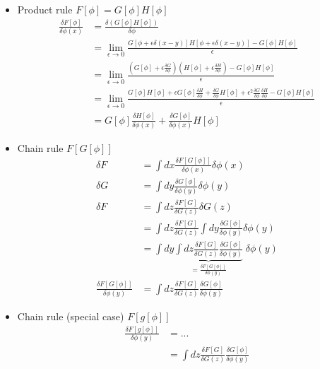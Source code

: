 \documentclass[10pt,a4paper]{article}
\theoremstyle{definition}
\begin{document}
\begin{itemize}
    \item Product rule $F[\phi]=G[\phi]H[\phi]$
    \begin{align}
        \frac{\delta F[\phi]}{\delta\phi(x)}
        &=\frac{\delta(G[\phi]H[\phi])}{\delta\phi}\\
        &=\lim_{\epsilon\rightarrow0}\frac{G[\phi+\epsilon\delta(x-y)]H[\phi+\epsilon\delta(x-y)]-G[\phi]H[\phi]}{\epsilon}\\
        &=\lim_{\epsilon\rightarrow0}\frac{\left(G[\phi]+\epsilon\frac{\delta G}{\delta\phi}\right)\left(H[\phi]+\epsilon\frac{\delta H}{\delta\phi}\right)-G[\phi]H[\phi]}{\epsilon}\\
        &=\lim_{\epsilon\rightarrow0}\frac{G[\phi]H[\phi]+\epsilon G[\phi]\frac{\delta H}{\delta\phi}+\frac{\delta G}{\delta\phi}H[\phi]+\epsilon^2\frac{\delta G}{\delta\phi}\frac{\delta H}{\delta\phi}-G[\phi]H[\phi]}{\epsilon}\\
        &=G[\phi]\frac{\delta H[\phi]}{\delta\phi(x)}+\frac{\delta G[\phi]}{\delta\phi(x)}H[\phi]
    \end{align}
    \item Chain rule $F[G[\phi]]$
    \begin{align}
        \delta F
        &=\int dx \frac{\delta F[G[\phi]]}{\delta\phi(x)} \delta\phi(x)\\
        \delta G
        &=\int dy \frac{\delta G[\phi]}{\delta\phi(y)} \delta\phi(y)\\
        \delta F
        &=\int dz \frac{\delta F[G]}{\delta G(z)} \delta G(z)\\
        &=\int dz \frac{\delta F[G]}{\delta G(z)} \int dy \frac{\delta G[\phi]}{\delta\phi(y)} \delta\phi(y) \\
        &=\int dy \underbrace{\int dz \frac{\delta F[G]}{\delta G(z)} \frac{\delta G[\phi]}{\delta\phi(y)}}_{=\frac{\delta F[G[\phi]]}{\delta\phi(y)}} \;\delta\phi(y) \\
        \frac{\delta F[G[\phi]]}{\delta\phi(y)}
        &=\int dz \frac{\delta F[G]}{\delta G(z)} \frac{\delta G[\phi]}{\delta\phi(y)}
    \end{align}
    \item Chain rule (special case) $F[g[\phi]]$
    \begin{align}
        \frac{\delta F[g[\phi]]}{\delta\phi(y)}
        &=...\\
        &=\int dz \frac{\delta F[G]}{\delta G(z)} \frac{\delta G[\phi]}{\delta\phi(y)}
    \end{align}
\end{itemize}
\end{document}
